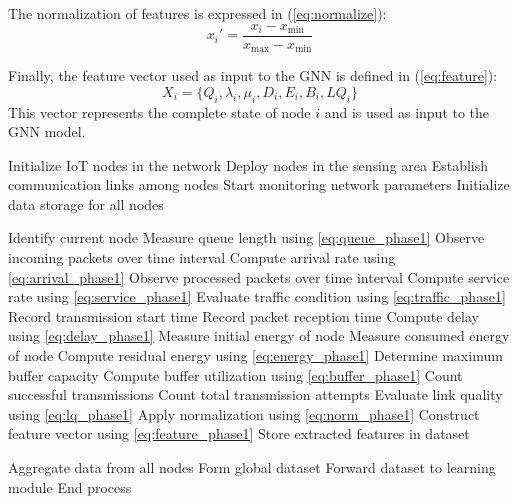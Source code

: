 \documentclass[a4paper,fleqn]{cas-dc}
\numberwithin{equation}{section}
\begin{document}
The normalization of features is expressed in (\ref{eq:normalize}):
\begin{equation}
x_i' = \frac{x_i - x_{\min}}{x_{\max} - x_{\min}}
\label{eq:normalize}
\end{equation}

Finally, the feature vector used as input to the GNN is defined in (\ref{eq:feature}):
\begin{equation}
X_i = \{Q_i, \lambda_i, \mu_i, D_i, E_i, B_i, LQ_i\}
\label{eq:feature}
\end{equation}
This vector represents the complete state of node \( i \) and is used as input to the GNN model.

\begin{algorithm}[H]
\caption{Data Collection and Feature Extraction for IoT Nodes}
\label{alg:data_collection}
\begin{algorithmic}

\STATE Initialize IoT nodes in the network
\STATE Deploy nodes in the sensing area
\STATE Establish communication links among nodes
\STATE Start monitoring network parameters
\STATE Initialize data storage for all nodes


\STATE Identify current node
\STATE Measure queue length using \ref{eq:queue_phase1}
\STATE Observe incoming packets over time interval
\STATE Compute arrival rate using \ref{eq:arrival_phase1}
\STATE Observe processed packets over time interval
\STATE Compute service rate using \ref{eq:service_phase1}
\STATE Evaluate traffic condition using \ref{eq:traffic_phase1}
\STATE Record transmission start time
\STATE Record packet reception time
\STATE Compute delay using \ref{eq:delay_phase1}
\STATE Measure initial energy of node
\STATE Measure consumed energy of node
\STATE Compute residual energy using \ref{eq:energy_phase1}
\STATE Determine maximum buffer capacity
\STATE Compute buffer utilization using \ref{eq:buffer_phase1}
\STATE Count successful transmissions
\STATE Count total transmission attempts
\STATE Evaluate link quality using \ref{eq:lq_phase1}
\STATE Apply normalization using \ref{eq:norm_phase1}
\STATE Construct feature vector using \ref{eq:feature_phase1}
\STATE Store extracted features in dataset

\ENDFOR

\STATE Aggregate data from all nodes
\STATE Form global dataset
\STATE Forward dataset to learning module
\STATE End process

\end{algorithmic}
\end{algorithm}
\end{document}
